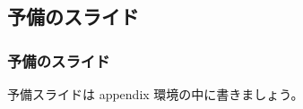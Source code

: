 \documentclass[dvipdfmx,cjk,xcolor=dvipsnames,envcountsect,notheorems,12pt]{beamer}
\theoremstyle{definition}
\begin{document}
\begin{appendix}


\section{予備のスライド}

\begin{frame}
  \frametitle{予備のスライド}
  予備スライドは appendix 環境の中に書きましょう。
\end{frame}

\end{appendix}
\end{document}
